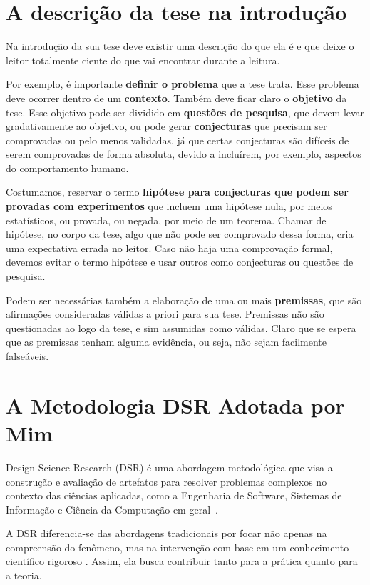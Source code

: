 \section{A descrição da tese na introdução}

Na introdução da sua tese deve existir uma descrição do que ela é e que deixe o leitor totalmente ciente do que vai encontrar durante a leitura.

Por exemplo, é importante \textbf{definir o problema} que a tese trata. Esse problema deve ocorrer dentro de um \textbf{contexto}. Também deve ficar claro o \textbf{objetivo} da tese. Esse objetivo pode ser dividido em \textbf{questões de pesquisa}, que devem levar gradativamente ao objetivo, ou pode gerar \textbf{conjecturas} que precisam ser comprovadas ou pelo menos validadas, já que certas conjecturas são difíceis de serem comprovadas de forma absoluta, devido a incluírem, por exemplo, aspectos do comportamento humano.

Costumamos, reservar o termo \textbf{hipótese para conjecturas que podem ser provadas com experimentos} que incluem uma hipótese nula, por meios estatísticos, ou provada, ou negada, por meio de um teorema. Chamar de hipótese, no corpo da tese, algo que não pode ser comprovado dessa forma, cria uma expectativa errada no leitor. Caso não haja uma comprovação formal, devemos evitar o termo hipótese e usar outros como conjecturas ou questões de pesquisa.

Podem ser necessárias também a elaboração de uma ou mais \textbf{premissas}, que são afirmações consideradas válidas a priori para sua tese. Premissas não são questionadas ao logo da tese, e sim assumidas como válidas. Claro que se espera que as premissas tenham alguma evidência, ou seja, não sejam facilmente falseáveis.

\section{A Metodologia DSR Adotada por Mim}

Design Science Research (DSR) é uma abordagem metodológica que visa a construção e avaliação de artefatos para resolver problemas complexos no contexto das ciências aplicadas, como a Engenharia de Software, Sistemas de Informação e Ciência da Computação em geral~\citep{hevner2004design}. 

A DSR diferencia-se das abordagens tradicionais por focar não apenas na compreensão do fenômeno, mas na intervenção com base em um conhecimento científico rigoroso \cite{hevner2004design, peffers2007design}. Assim, ela busca contribuir tanto para a prática quanto para a teoria.

